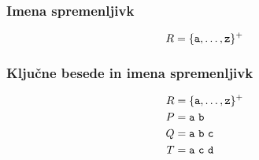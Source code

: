 \documentclass{report}
\newcommand{\N}[1]{#1}
\newcommand{\Char}[1]{\texttt{#1}}
\newcommand{\Spc}{\ }
\newcommand{\KleenePlus}[1]{#1^+}
\newcommand{\RE}[1]{{\uppercase{#1}}}
\begin{document}
\subsubsection{Imena spremenljivk}
\begin{equation*}
  \N{\RE{r}} = \KleenePlus{\{\Char{a}, \dots, \Char{z}\}}
\end{equation*}

\subsubsection{Ključne besede in imena spremenljivk}
\begin{align*}
  \N{\RE{r}} &= \KleenePlus{\{\Char{a}, \dots, \Char{z}\}}\\
  \N{\RE{p}} &= \Char{a} \Spc \Char{b}\\
  \N{\RE{q}} &= \Char{a} \Spc \Char{b} \Spc \Char{c}\\
  \N{\RE{t}} &= \Char{a} \Spc \Char{c} \Spc \Char{d}
\end{align*}
\end{document}
